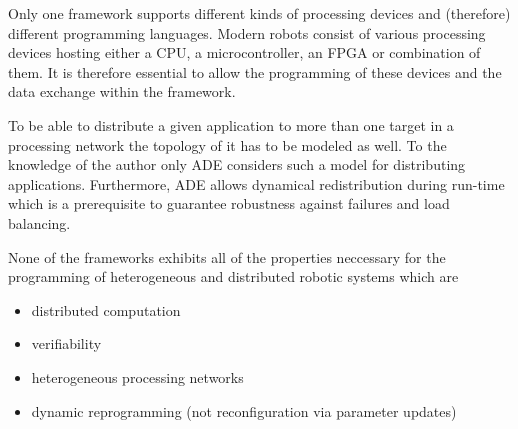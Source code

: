 \documentclass[a4paper,twocolumn]{esapub2005} %
\begin{document}
Only one framework supports different kinds of processing devices and (therefore) different programming languages.
Modern robots consist of various processing devices hosting either a CPU, a microcontroller, an FPGA or combination of them.
It is therefore essential to allow the programming of these devices and the data exchange within the framework.

To be able to distribute a given application to more than one target in a processing network the topology of it has to be modeled as well.
To the knowledge of the author only ADE considers such a model for distributing applications.
Furthermore, ADE allows dynamical redistribution during run-time which is a prerequisite to guarantee robustness against failures and load balancing.

None of the frameworks exhibits all of the properties neccessary for the programming of heterogeneous and distributed robotic systems which are
\begin{itemize}
    \item distributed computation
    \item verifiability
    \item heterogeneous processing networks
    \item dynamic reprogramming (not reconfiguration via parameter updates)
\end{itemize}
\end{document}
